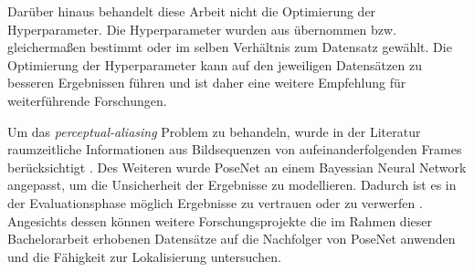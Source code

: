 Darüber hinaus behandelt diese Arbeit nicht die Optimierung der Hyperparameter. Die Hyperparameter wurden aus \citet{acharyaBIMPoseNetIndoorCamera2019} übernommen bzw. gleichermaßen bestimmt oder im selben Verhältnis zum Datensatz gewählt. Die Optimierung der Hyperparameter kann auf den jeweiligen Datensätzen zu besseren Ergebnissen führen und ist daher eine weitere Empfehlung für weiterführende Forschungen. 

Um das \textit{perceptual-aliasing} Problem zu behandeln, wurde in der Literatur raumzeitliche Informationen aus Bildsequenzen von aufeinanderfolgenden Frames berücksichtigt \cite{walchImageBasedLocalizationUsing2017, clarkVidLocDeepSpatioTemporal2017}. Des Weiteren wurde PoseNet an einem Bayessian Neural Network angepasst, um die Unsicherheit der Ergebnisse zu modellieren. Dadurch ist es in der Evaluationsphase möglich Ergebnisse zu vertrauen oder zu verwerfen \cite{kendallModellingUncertaintyDeep2016}. Angesichts dessen können weitere Forschungsprojekte die im Rahmen dieser Bachelorarbeit erhobenen Datensätze auf die Nachfolger von PoseNet \cite{kendallModellingUncertaintyDeep2016, walchImageBasedLocalizationUsing2017, clarkVidLocDeepSpatioTemporal2017} anwenden und die Fähigkeit zur Lokalisierung untersuchen.